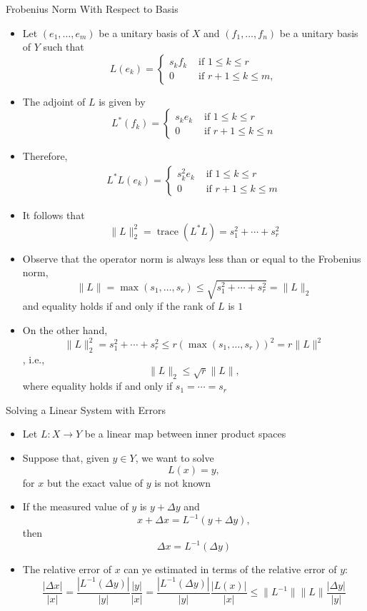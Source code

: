 \documentclass[usenames,dvipsnames,10pt]{beamer}
\newcommand\trace{\operatorname{trace}}
\begin{document}
\begin{frame}
  {Frobenius Norm With Respect to Basis}

  \begin{itemize}
  \item Let $(e_1, \dots, e_m)$ be a unitary basis of $X$ and $(f_1, \dots, f_n)$ be a unitary basis of $Y$ such that
    \[
      L(e_k) =
      \begin{cases}
        s_kf_k &\text{ if }1 \le k \le r\\
        0 &\text{ if }r+1 \le k \le m,
      \end{cases}
    \]
  \item The adjoint of $L$ is given by
    \[
      L^*(f_k) =
      \begin{cases}
        s_ke_k &\text{ if }1 \le k \le r\\
        0 &\text{ if }r+1 \le k \le n
      \end{cases}
    \]
  \item Therefore,
    \begin{align*}
      L^*L(e_k) = 
      \begin{cases}
        s_k^2e_k &\text{ if }1 \le k \le r\\
        0 &\text{ if }r+1 \le k \le m
      \end{cases}
    \end{align*}
  \item It follows that
    \[
      \|L\|_2^2 = \trace(L^*L) = s_1^2 + \cdots + s_r^2
    \]
  \item Observe that the operator norm is always less than or equal to the Frobenius norm,
    \[ \|L\| = \max(s_1, \dots, s_r) \le \sqrt{s_1^2 + \cdots + s_r^2} = \|L\|_2 \]
    and equality holds if and only if the rank of $L$ is $1$
  \item On the other hand,
    \[ \|L\|_2^2 = s_1^2 + \cdots + s_r^2 \le r(\max(s_1, \dots, s_r))^2 = r\|L\|^2 \],
    i.e.,
    \[ \|L\|_2 \le \sqrt{r}\|L\|, \]
    where equality holds if and only if $s_1 = \cdots = s_r$
  \end{itemize}
\end{frame}

\begin{frame}
  {Solving a Linear System with Errors}

  \begin{itemize}
  \item Let $L: X \rightarrow Y$ be a linear map between inner product spaces
  \item Suppose that, given $y \in Y$, we want to solve
    \[ L(x) = y, \]
    for $x$ but the exact value of $y$ is not known
  \item If the measured value of $y$ is $y + \Delta y$ and
    \[ x + \Delta x = L^{-1}(y+\Delta y), \]
    then
    \[
      \Delta x = L^{-1}(\Delta y)
    \]
  \item The relative error of $x$ can ye estimated in terms of the relative error of $y$:
    \[ \frac{|\Delta x|}{|x|} = \frac{|L^{-1}(\Delta y)|}{|y|}\frac{|y|}{|x|}
      = \frac{|L^{-1}(\Delta y)|}{|y|}\frac{|L(x)|}{|x|}
      \le \|L^{-1}\|\|L\|\frac{|\Delta y|}{|y|} \]
  \end{itemize}
\end{frame}
\end{document}
